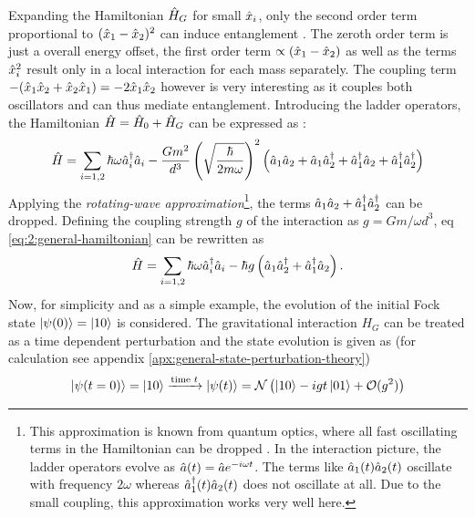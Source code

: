 Expanding the Hamiltonian $\hat{H}_G$ for small $\hat{x}_i$, only the second order term proportional to $(\hat{x}_1 - \hat{x}_2)^2$ can induce entanglement \cite{Krisnanda_2020}. The zeroth order term is just a overall energy offset, the first order term $\propto (\hat{x}_1 - \hat{x}_2)$ as well as the terms $\hat{x}^2_i$ result only in a local interaction for each mass separately. The coupling term $ - (\hat{x}_1\hat{x}_2 + \hat{x}_2\hat{x}_1) = -2\hat{x}_1\hat{x}_2$ however is very interesting as it couples both oscillators and can thus mediate entanglement.
Introducing the ladder operators, the Hamiltonian $\hat{H}=\hat{H}_0 + \hat{H}_G$ can be expressed as \cite{Carney_2018}:
\begin{equation}\label{eq:2:general-hamiltonian}
  \hat{H} = \sum_{i=1,2} \hbar \omega \hat{a}_i^\dagger \hat{a}_i - \frac{Gm^2}{d^3} \left(\sqrt{\frac{\hbar}{2m\omega}}\right)^2 \left( \hat{a}_1\hat{a}_2 + \hat{a}_1\hat{a}^\dagger_2 + \hat{a}^\dagger_1\hat{a}_2 + \hat{a}^\dagger_1\hat{a}^\dagger_2 \right)
\end{equation}
Applying the \textit{rotating-wave approximation}\footnote{This approximation is known from quantum optics, where all fast oscillating terms in the Hamiltonian can be dropped \cite{Carney_2018,Lami_2024}. In the interaction picture, the ladder operators evolve as $\hat{a}(t) = \hat{a}e^{-i\omega t}$. The terms like $\hat{a}_1(t)\hat{a}_2(t)$ oscillate with frequency $2\omega$ whereas $\hat{a}_1^\dagger(t) \hat{a}_2(t)$ does not oscillate at all. Due to the small coupling, this approximation works very well here.}, the terms $\hat{a}_1\hat{a}_2 + \hat{a}^\dagger_1\hat{a}^\dagger_2$ can be dropped. Defining the coupling strength $g$ of the interaction as $g = Gm/\omega d^3$, eq \eqref{eq:2:general-hamiltonian} can be rewritten as
\begin{equation}
  \hat{H} = \sum_{i=1,2} \hbar \omega \hat{a}_i^\dagger \hat{a}_i - \hbar g \left( \hat{a}_1\hat{a}^\dagger_2 + \hat{a}^\dagger_1\hat{a}_2 \right) .
\end{equation}
Now, for simplicity and as a simple example, the evolution of the initial Fock state $\ket{\psi(0)} = \ket{10}$ is considered. The gravitational interaction $H_G$ can be treated as a time dependent perturbation and the state evolution is given as (for calculation see appendix \ref{apx:general-state-perturbation-theory}) \cite{Carney_2018}
\begin{equation} \label{eq:2:general-evolved-state}
  \ket{\psi(t = 0)} = \ket{10} \xrightarrow{\text{time }t} \ket{\psi(t)} =  \mathcal{N} \left(\ket{10} - i g t \ket{01} + \mathcal{O}(g^2) \right)
\end{equation}
